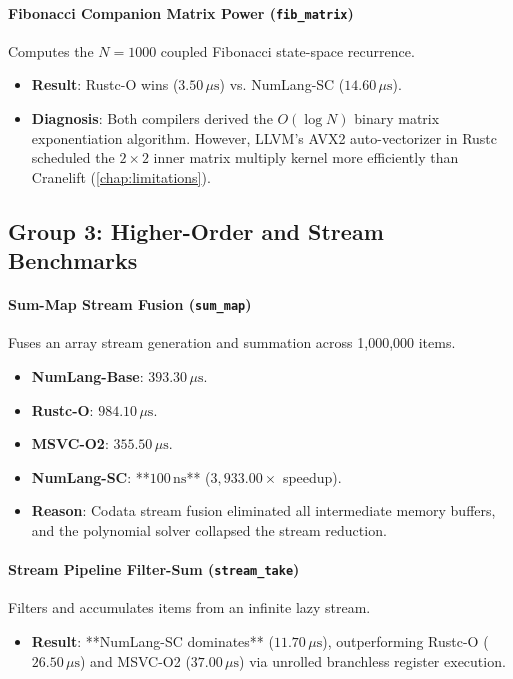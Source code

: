 \paragraph{Fibonacci Companion Matrix Power (\texttt{fib\_matrix})}
Computes the $N=1000$ coupled Fibonacci state-space recurrence.
\begin{itemize}
    \item \textbf{Result}: Rustc-O wins ($3.50\,\mu\text{s}$) vs. NumLang-SC ($14.60\,\mu\text{s}$).
    \item \textbf{Diagnosis}: Both compilers derived the $O(\log N)$ binary matrix exponentiation algorithm. However, LLVM's AVX2 auto-vectorizer in Rustc scheduled the $2 \times 2$ inner matrix multiply kernel more efficiently than Cranelift (\cref{chap:limitations}).
\end{itemize}

\subsection{Group 3: Higher-Order and Stream Benchmarks}

\paragraph{Sum-Map Stream Fusion (\texttt{sum\_map})}
Fuses an array stream generation and summation across 1,000,000 items.
\begin{itemize}
    \item \textbf{NumLang-Base}: $393.30\,\mu\text{s}$.
    \item \textbf{Rustc-O}: $984.10\,\mu\text{s}$.
    \item \textbf{MSVC-O2}: $355.50\,\mu\text{s}$.
    \item \textbf{NumLang-SC}: **$100\,\text{ns}$** ($3,933.00\times$ speedup).
    \item \textbf{Reason}: Codata stream fusion eliminated all intermediate memory buffers, and the polynomial solver collapsed the stream reduction.
\end{itemize}

\paragraph{Stream Pipeline Filter-Sum (\texttt{stream\_take})}
Filters and accumulates items from an infinite lazy stream.
\begin{itemize}
    \item \textbf{Result}: **NumLang-SC dominates** ($11.70\,\mu\text{s}$), outperforming Rustc-O ($26.50\,\mu\text{s}$) and MSVC-O2 ($37.00\,\mu\text{s}$) via unrolled branchless register execution.
\end{itemize}

